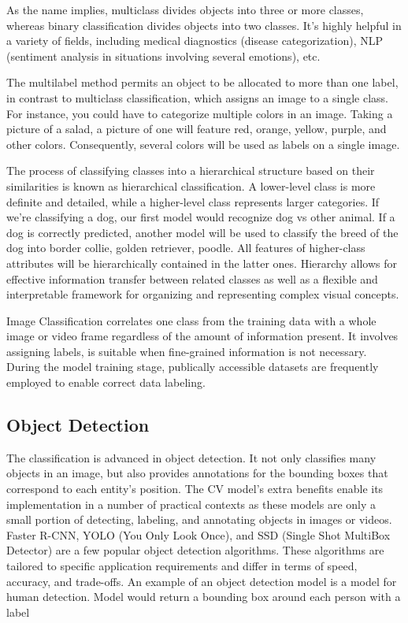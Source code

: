 	As the name implies, multiclass divides objects into three or more classes, whereas binary classification divides objects into two classes. It's highly helpful in a variety of fields, including medical diagnostics (disease categorization), NLP (sentiment analysis in situations involving several emotions), etc.
	 
	The multilabel method permits an object to be allocated to more than one label, in contrast to multiclass classification, which assigns an image to a single class. For instance, you could have to categorize multiple colors in an image. Taking a picture of a  salad, a picture of one will feature red, orange, yellow, purple, and other colors. Consequently, several colors will be used as labels on a single image.
	
	The process of classifying classes into a hierarchical structure based on their similarities is known as hierarchical classification. A lower-level class is more definite and detailed, while a higher-level class represents larger categories. If we're classifying a dog, our first model would recognize dog vs other animal. If a dog is correctly predicted, another model will be used to classify the breed of the dog into border collie, golden retriever, poodle. All features of higher-class attributes will be hierarchically contained in the latter ones. Hierarchy allows for effective information transfer between related classes as well as a flexible and interpretable framework for organizing and representing complex visual concepts.
	

Image Classification correlates one class from the training data with a whole image or video frame regardless of the amount of information present. It involves assigning labels, is suitable when fine-grained information is not necessary. During the model training stage, publically accessible datasets are frequently employed to enable correct data labeling.
\subsection*{Object Detection}
	The classification is advanced in object detection. It not only classifies many objects in an image, but also provides annotations for the bounding boxes that correspond to each entity's position. The CV model's extra benefits enable its implementation in a number of practical contexts as these models are only a small portion of detecting, labeling, and annotating objects in images or videos. Faster R-CNN, YOLO (You Only Look Once), and SSD (Single Shot MultiBox Detector) are a few popular object detection algorithms. These algorithms are tailored to specific application requirements and differ in terms of speed, accuracy, and trade-offs.  An example of an object detection model is a model for human detection. Model would return a bounding box around each person with a label
	
